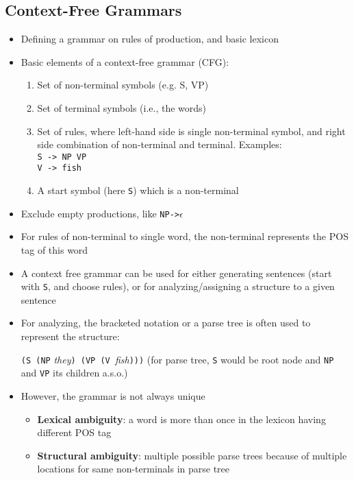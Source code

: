 \subsection{Context-Free Grammars}
\begin{itemize}
	\item Defining a grammar on rules of production, and basic lexicon
	\item Basic elements of a context-free grammar (CFG):
	\begin{enumerate}
		\item Set of non-terminal symbols (e.g. S, VP)
		\item Set of terminal symbols (i.e., the words)
		\item Set of rules, where left-hand side is single non-terminal symbol, and right side combination of non-terminal and terminal. Examples:\\
		\texttt{S -> NP VP}\\
		\texttt{V -> fish}
		\item A start symbol (here \texttt{S}) which is a non-terminal
	\end{enumerate}
	\item Exclude empty productions, like \texttt{NP->$\epsilon$}
	\item For rules of non-terminal to single word, the non-terminal represents the POS tag of this word
	\item A context free grammar can be used for either generating sentences (start with \texttt{S}, and choose rules), or for analyzing/assigning a structure to a given sentence
	\item For analyzing, the bracketed notation or a parse tree is often used to represent the structure:
	
	\texttt{(S (NP} \textit{they}\texttt{) (VP (V }\textit{fish}\texttt{)))}  (for parse tree, \texttt{S} would be root node and \texttt{NP} and \texttt{VP} its children a.s.o.)
	\item However, the grammar is not always unique 
	\begin{itemize}
		\item \textbf{Lexical ambiguity}: a word is more than once in the lexicon having different POS tag
		\item \textbf{Structural ambiguity}: multiple possible parse trees because of multiple locations for same non-terminals in parse tree
	\end{itemize}
\end{itemize}
